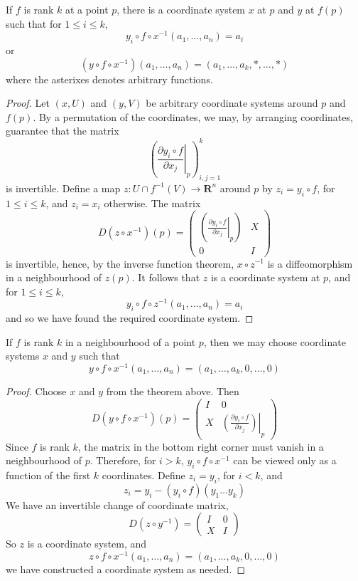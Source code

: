 \begin{theorem}
    If $f$ is rank $k$ at a point $p$, there is a coordinate system $x$ at $p$ and $y$ at $f(p)$ such that for $1 \leq i \leq k$,
    \[ y_i \circ f \circ x^{-1}(a_1, \dots, a_n) = a_i \]
    or
    \[ (y \circ f \circ x^{-1})(a_1, \dots, a_n) = (a_1, \dots, a_k, *,\dots, *) \]
    where the asterixes denotes arbitrary functions.
\end{theorem}
\begin{proof}
    Let $(x,U)$ and $(y,V)$ be arbitrary coordinate systems around $p$ and $f(p)$. By a permutation of the coordinates, we may, by arranging coordinates, guarantee that the matrix
    \[ \left( \left.\frac{\partial y_i \circ f}{\partial x_j}\right|_p \right)_{i,j = 1}^k \]
    is invertible. Define a map $z:U \cap f^{-1}(V) \to \mathbf{R}^n$ around $p$ by $z_i = y_i \circ f$, for $1 \leq i \leq k$, and $z_i = x_i$ otherwise. The matrix
    \[ D(z \circ x^{-1})(p) = \begin{pmatrix} \left( \left.\frac{\partial y_i \circ f}{\partial x_j}\right|_p \right) & X \\ 0 & I \end{pmatrix} \]
    is invertible, hence, by the inverse function theorem, $x \circ z^{-1}$ is a diffeomorphism in a neighbourhood of $z(p)$. It follows that $z$ is a coordinate system at $p$, and for $1 \leq i \leq k$,
    \[ y_i \circ f \circ z^{-1}(a_1, \dots, a_n) = a_i \]
    and so we have found the required coordinate system.
\end{proof}

\begin{corollary}
    If $f$ is rank $k$ in a neighbourhood of a point $p$, then we may choose coordinate systems $x$ and $y$ such that
    \[ y \circ f \circ x^{-1}(a_1, \dots, a_n) = (a_1, \dots, a_k, 0, \dots, 0) \]
\end{corollary}
\begin{proof}
    Choose $x$ and $y$ from the theorem above. Then
    \[ D(y \circ f \circ x^{-1})(p) = \begin{pmatrix} I & 0 \\ X & \left.\left( \frac{\partial y_i \circ f}{\partial x_j} \right)\right|_p \end{pmatrix} \]
    Since $f$ is rank $k$, the matrix in the bottom right corner must vanish in a neighbourhood of $p$. Therefore, for $i > k$, $y_i \circ f \circ x^{-1}$ can be viewed only as a function of the first $k$ coordinates. Define $z_i = y_i$, for $i < k$, and
    \[ z_i = y_i - (y_i \circ f)(y_1 \dots y_k) \]
    We have an invertible change of coordinate matrix,
    \[ D(z \circ y^{-1}) = \begin{pmatrix} I & 0 \\ X & I \end{pmatrix} \]
    So $z$ is a coordinate system, and
    \[ z \circ f \circ x^{-1}(a_1, \dots, a_n) = (a_1, \dots, a_k, 0, \dots, 0) \]
    we have constructed a coordinate system as needed.
\end{proof}


